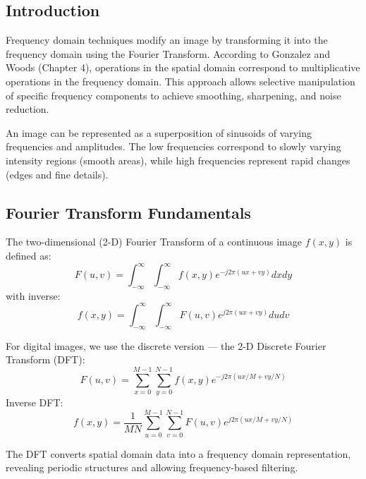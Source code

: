 \documentclass[12pt,a4paper]{AnantDocumentation}
\begin{document}
\subsection{Introduction}
Frequency domain techniques modify an image by transforming it into the frequency domain using the Fourier Transform. According to Gonzalez and Woods (Chapter 4), operations in the spatial domain correspond to multiplicative operations in the frequency domain. This approach allows selective manipulation of specific frequency components to achieve smoothing, sharpening, and noise reduction.

An image can be represented as a superposition of sinusoids of varying frequencies and amplitudes. The low frequencies correspond to slowly varying intensity regions (smooth areas), while high frequencies represent rapid changes (edges and fine details).

\subsection{Fourier Transform Fundamentals}
The two-dimensional (2-D) Fourier Transform of a continuous image $f(x, y)$ is defined as:
\begin{equation}
F(u, v) = \int_{-\infty}^{\infty}\int_{-\infty}^{\infty} f(x, y) e^{-j2\pi(ux + vy)} dx dy
\end{equation}
with inverse:
\begin{equation}
f(x, y) = \int_{-\infty}^{\infty}\int_{-\infty}^{\infty} F(u, v) e^{j2\pi(ux + vy)} du dv
\end{equation}

For digital images, we use the discrete version — the 2-D Discrete Fourier Transform (DFT):
\begin{equation}
F(u,v) = \sum_{x=0}^{M-1}\sum_{y=0}^{N-1} f(x,y)e^{-j2\pi(ux/M+vy/N)}
\end{equation}
Inverse DFT:
\begin{equation}
f(x,y) = \frac{1}{MN}\sum_{u=0}^{M-1}\sum_{v=0}^{N-1} F(u,v)e^{j2\pi(ux/M+vy/N)}
\end{equation}

The DFT converts spatial domain data into a frequency domain representation, revealing periodic structures and allowing frequency-based filtering.
\end{document}
